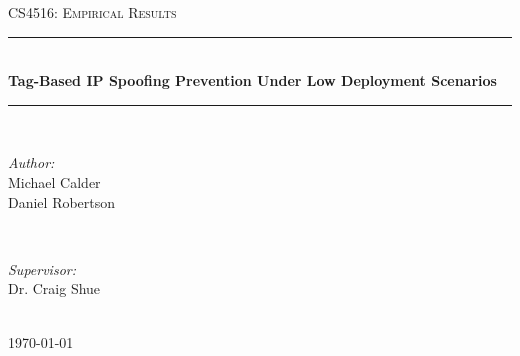 \documentclass[12pt]{article} %
\begin{document}

\begin{titlepage}

\newcommand{\HRule}{\rule{\linewidth}{0.5mm}} %

\center %

\textsc{\LARGE CS4516: Empirical Results}\\[1.5cm] %

\HRule \\[0.4cm]
{ \huge \bfseries Tag-Based IP Spoofing Prevention Under Low Deployment Scenarios}\\[0.4cm] %
\HRule \\[1.5cm]

\begin{minipage}{0.4\textwidth}
\begin{flushleft} \large
\emph{Author:}\\
Michael Calder\\
Daniel Robertson\\
\end{flushleft}
\end{minipage}
~
\begin{minipage}{0.4\textwidth}
\begin{flushright} \large
\emph{Supervisor:} \\
Dr. Craig Shue %
\end{flushright}
\end{minipage}\\[4cm]

{\large \today}\\[3cm] %


\vfill %

\end{titlepage}

\end{document}
